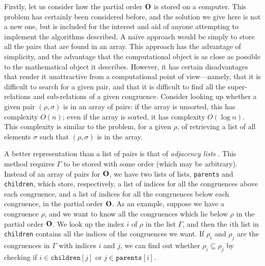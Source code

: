 Firstly, let us consider how the partial order $\mathbf{O}$ is stored on a computer.
This problem has certainly been considered before, and the solution we give here
is not a new one, but is included for the interest and aid of anyone attempting
to implement the algorithms described.  A na\"ive approach would be simply to
store all the pairs that are found in an array.  This approach has the advantage
of simplicity, and the advantage that the computational object is as close as
possible to the mathematical object it describes.  However, it has certain
disadvantages that render it unattractive from a computational point of
view---namely, that it is difficult to search for a given pair, and that it is
difficult to find all the super-relations and sub-relations of a given
congruence.  Consider looking up whether a given pair $(\rho,\sigma)$ is in an
array of pairs: if the array is unsorted, this has complexity $O(n)$; even if
the array is sorted, it has complexity $O(\log n)$.  This complexity is similar
to the problem, for a given $\rho$, of retrieving a list of all elements
$\sigma$ such that $(\rho, \sigma)$ is in the array.

A better representation than a list of pairs is that of \textit{adjacency lists}
\cite{adj_list}.  This method requires $\Gamma$ to be stored with some
order (which may be arbitrary).  Instead of an array of pairs for $\mathbf{O}$, we have
two lists of lists, \texttt{parents} and \texttt{children}, which store,
respectively, a list of indices for all the congruences above each congruence,
and a list of indices for all the congruences below each congruence, in the
partial order $\mathbf{O}$.  As an example, suppose we have a congruence $\rho$, and we
want to know all the congruences which lie below $\rho$ in the partial order
$\mathbf{O}$.  We look up the index $i$ of $\rho$ in the list $\Gamma$, and then the
$i$th list in \texttt{children} contains all the indices of the congruences we
want.  If $\rho_i$ and $\rho_j$ are the congruences in $\Gamma$ with indices $i$
and $j$, we can find out whether $\rho_i \subseteq \rho_j$ by checking if
$i \in \mathtt{children}[j]$ or $j \in \mathtt{parents}[i]$.


